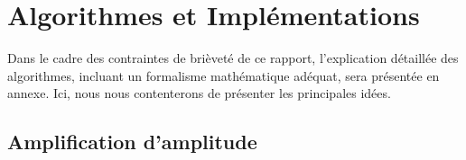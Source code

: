 \section{Algorithmes et Implémentations}

Dans le cadre des contraintes de brièveté de ce rapport, l'explication détaillée des algorithmes, incluant un formalisme mathématique adéquat, sera présentée en annexe. Ici, nous nous contenterons de présenter les principales idées. %

\subsection{Amplification d'amplitude}


